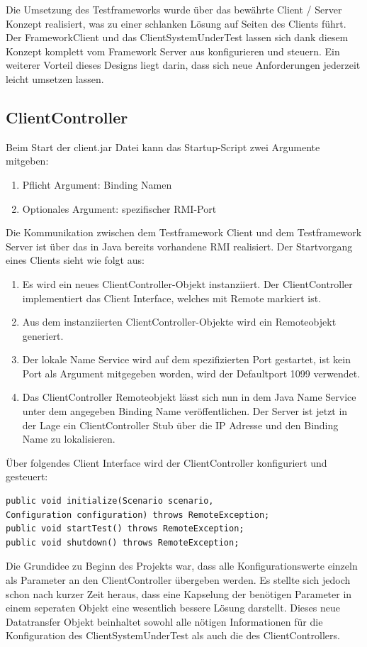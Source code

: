 Die Umsetzung des Testframeworks wurde über das bewährte Client / Server Konzept realisiert, was zu einer schlanken Lösung auf Seiten des Clients führt. Der FrameworkClient und das ClientSystemUnderTest lassen sich dank die\-sem Konzept komplett vom Framework Server aus konfigurieren und steuern. Ein weiterer Vorteil dieses Designs liegt darin, dass sich neue Anforderungen jederzeit leicht umsetzen lassen.

\subsection{ClientController}
\label{sec:clientController}
 
Beim Start der client.jar Datei kann das Startup-Script zwei Argumente mitgeben:
\begin{enumerate}
\item Pflicht Argument: Binding Namen
\item Optionales Argument: spezifischer RMI-Port
\end{enumerate}
Die Kommunikation zwischen dem Testframework Client und dem Testframework Server ist über das in Java bereits vorhandene RMI \cite{java_rmi} realisiert. Der Startvorgang eines Clients sieht wie folgt aus:
\begin{enumerate}
\item Es wird ein neues ClientController-Objekt instanziiert. Der ClientController implementiert das Client Interface, welches mit Remote markiert ist.
\item Aus dem instanziierten ClientController-Objekte wird ein Remoteobjekt generiert.
\item Der lokale Name Service wird auf dem spezifizierten Port gestartet, ist kein Port als Argument mitgegeben worden, wird der Defaultport 1099 verwendet.
\item Das ClientController Remoteobjekt lässt sich nun in dem Java Name Service unter dem angegeben Binding Name veröffentlichen. Der Server ist jetzt in der Lage ein ClientController Stub über die IP Adresse und den Binding Name zu lokalisieren.
\end{enumerate}

Über folgendes Client Interface wird der ClientController konfiguriert und gesteuert:
\begin{verbatim} 	
public void initialize(Scenario scenario, 
Configuration configuration) throws RemoteException;
public void startTest() throws RemoteException;
public void shutdown() throws RemoteException;
\end{verbatim}
Die Grundidee zu Beginn des Projekts war, dass alle Konfigurationswerte einzeln als Parameter an den ClientController übergeben werden. Es stellte sich je\-doch schon nach kurzer Zeit her\-aus, dass eine Kap\-se\-lung der be\-nötigen Para\-meter in einem seperaten Objekt eine wesentlich bessere Lösung darstellt. Dieses neue Datatransfer Objekt beinhaltet sowohl alle nötigen Informationen für die Konfiguration des ClientSystemUnderTest als auch die des ClientControllers.

